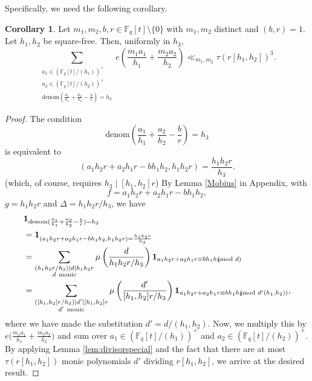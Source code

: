 \documentclass{article}
\theoremstyle{definition}
\newtheorem{cor}{Corollary}[section]
\theoremstyle{definition}
\theoremstyle{remark}
\newcommand{\F}{\mathbb{F}_q[t]}
\newcommand{\1}{\mathbf{1}}
\numberwithin{equation}{section}
\begin{document}
Specifically, we need the following corollary. 
\begin{cor}\label{bound1}
Let $m_1,m_2,b,r\in \F\setminus \{0\}$ with $m_1,m_2$ distinct and $(b,r)=1$. Let $h_1,h_2$ be square-free. Then, uniformly in $h_3$,  
\[\sum_{\substack{a_1\in (\F/(h_1))^\times\\a_2\in (\F/(h_2))^\times\\\text{denom}(\frac{a_1}{h_1}+\frac{a_2}{h_2}-\frac{b}{r})=h_3}}e\left(\frac{m_1a_1}{h_1}+\frac{m_2a_2}{h_2}\right)\ll_{m_1,m_2}\tau(r[h_1,h_2])^3.\]
\end{cor}
\begin{proof}
The condition 
\[\text{denom}\left(\frac{a_1}{h_1}+\frac{a_2}{h_2}-\frac{b}{r}\right)=h_3\]
is equivalent to 
\[(a_1h_2r+a_2h_1r-bh_1h_2,h_1h_2r)=\frac{h_1h_2r}{h_3}.\]
(which, of course, requires $h_3\mid [h_1,h_2]r$) By Lemma \ref{Mobius} in Appendix, with \[f=a_1h_2r+a_2h_1r-bh_1h_2,\] $g=h_1h_2r$ and $\Delta=h_1h_2r\slash h_3$, we have 
\begin{align*}
&\1_{\text{denom}(\frac{a_1}{h_1}+\frac{a_2}{h_2}-\frac{b}{r})=h_3}\\
&=\1_{(a_1h_2r+a_2h_1r-bh_1h_2,h_1h_2r)=\frac{h_1h_2r}{h_3}}\\
&=\sum_{\substack{(h_1h_2r\slash h_3)\mid d\mid h_1h_2r\\ d~\text{monic}}}\mu\left(\frac{d}{h_1h_2r\slash h_3}\right)\1_{a_1h_2r+a_2h_1r\equiv bh_1h_2\hspace*{-2.5mm}\pmod{d}}\\
&=\sum_{\substack{([h_1,h_2]r\slash h_3)\mid d'\mid [h_1,h_2]r\\ d'~\text{monic}}}\mu\left(\frac{d'}{[h_1,h_2]r\slash h_3}\right)\1_{a_1h_2r+a_2h_1r\equiv bh_1h_2\hspace*{-2.5mm}\pmod{d'(h_1,h_2)}},
\end{align*}
where we have made the substitution $d'=d\slash (h_1,h_2)$. Now, we multiply this by $e\big(\frac{m_1a_1}{h_1}+\frac{m_2a_2}{h_2}\big)$ and sum over $a_1\in (\F/(h_1))^\times$ and $a_2\in (\F/(h_2))^\times$. By applying Lemma \ref{lem:divisorspecial} and the fact that there are at most $\tau(r[h_1,h_2])$ monic polynomials $d'$ dividing $r[h_1,h_2]$, we arrive at the desired result. 
\end{proof}
\end{document}
